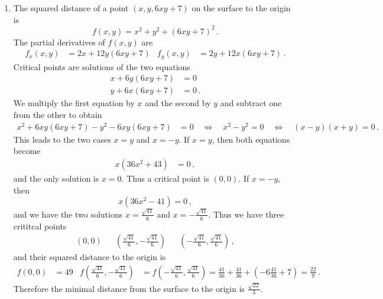 \begin{solution}
\begin{enumerate}
\item
The squared distance of a point $\left(x, y, 6xy+7\right)$ on the surface to the origin is
\[
f(x,y) = x^2 + y^2 + \left(6xy+7\right)^2\,.
\]
The partial derivatives of $f(x,y)$ are
\begin{align*}
f_x(x,y) &= 2x + 12y (6xy+7) &
f_y(x,y) &= 2y + 12x (6xy+7)\,.
\end{align*}
Critical points are solutions of the two equations
\begin{align*}
x + 6y(6xy+7) &= 0 \\
y + 6x(6xy+7) &= 0\,.
\end{align*}
We multiply the first equation by $x$ and the second by $y$ and subtract one from the other to obtain
\begin{align*}
x^2 + 6xy(6xy+7) - y^2 - 6xy(6xy+7) &= 0
\quad\Leftrightarrow\quad
x^2 - y^2 = 0 
\quad\Leftrightarrow\quad
(x-y)(x+y) = 0\,.
\end{align*}
This leads to the two cases $x=y$ and $x=-y$. If $x=y$, then both equations become
\begin{align*}
x\left(36x^2 + 43\right) &= 0 \,,
\end{align*}
and the only solution is $x=0$. Thus a critical point is $(0,0)$. If $x=-y$, then
\[
x \left(36x^2 - 41 \right) = 0\,,
\]
and we have the two solutions $x = \frac{\sqrt{41}}6$ and $x = -\frac{\sqrt{41}}6$. Thus we have three crititcal points
\begin{align*}
(0,0) &&
\left( \frac{\sqrt{41}}6, -\frac{\sqrt{41}}6 \right) &&
\left( -\frac{\sqrt{41}}6, \frac{\sqrt{41}}6 \right)\,,
\end{align*}
and their squared distance to the origin is
\begin{align*}
f(0,0) &= 49 &
f\left( \frac{\sqrt{41}}6, -\frac{\sqrt{41}}6 \right) &=
f\left( -\frac{\sqrt{41}}6, \frac{\sqrt{41}}6 \right) = \frac{41}{36} + \frac{41}{36} + \left(-6 \frac{41}{36} + 7 \right)
= \frac{22}{9}\,.
\end{align*}
Therefore the minimal distance from the surface to the origin is $\frac{\sqrt{22}}3$.


\end{enumerate}
\end{solution}

